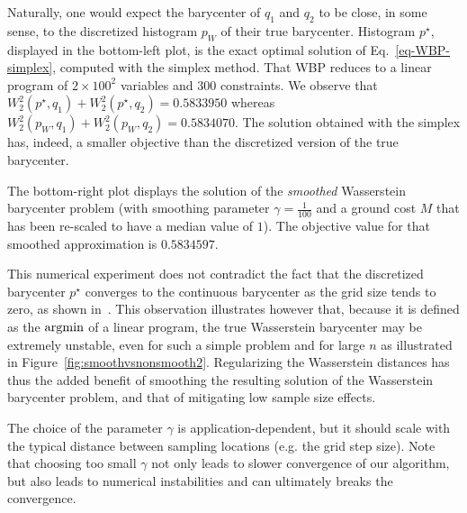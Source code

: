 Naturally, one would expect the barycenter of $q_1$ and $q_2$ to be close, in some sense, to the discretized histogram $p_W$ of their true barycenter. Histogram $p^\star$, displayed in the bottom-left plot, is the exact optimal solution of Eq.~\eqref{eq-WBP-simplex}, computed with the simplex method. That WBP reduces to a linear program of $2\times 100^2$ variables and $300$ constraints. We observe that $W_2^2(p^\star,q_1)+W_2^2(p^\star,q_2)=0.5833950$ whereas  $W_2^2(p_W,q_1)+W_2^2(p_W,q_2)=0.5834070$. The solution obtained with the simplex has, indeed, a smaller objective than the discretized version of the true barycenter.

The bottom-right plot displays the solution of the \emph{smoothed} Wasserstein barycenter problem (with smoothing parameter $\gamma=\frac{1}{100}$ and a ground cost $M$ that has been re-scaled to have a median value of $1$). The objective value for that smoothed approximation is $0.5834597$.

This numerical experiment does not contradict the fact that the discretized barycenter $p^\star$ converges to the continuous barycenter as the grid size tends to zero, as shown in~\cite{Carlier-NumericsBarycenters}. This observation illustrates however that, because it is defined as the $\operatorname{argmin}$ of a linear program, the true Wasserstein barycenter may be extremely unstable, even for such a simple problem and for large $n$ as illustrated in Figure~\ref{fig:smoothvsnonsmooth2}. Regularizing the Wasserstein distances has thus the added benefit of smoothing the resulting solution of the Wasserstein barycenter problem, and that of mitigating low sample size effects.

The choice of the parameter $\gamma$ is application-dependent, but it should scale with the typical distance between sampling locations (e.g. the grid step size). Note that choosing too small $\gamma$ not only leads to slower convergence of our algorithm, but also leads to numerical instabilities and can ultimately breaks the convergence.  

%

